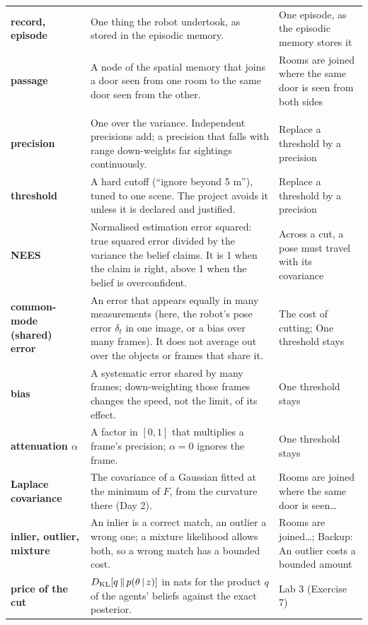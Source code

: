 \documentclass[11pt]{article}
\begin{document}
\begin{longtable}{@{}>{\raggedright\bfseries}p{2.8cm} p{8.9cm} >{\raggedright\arraybackslash}p{4.2cm}@{}}
record, episode & One thing the robot undertook, as stored in the episodic memory. & One episode, as the episodic memory stores it\\
passage & A node of the spatial memory that joins a door seen from one room to the same door seen from the other. & Rooms are joined where the same door is seen from both sides\\
\midrule
\multicolumn{3}{@{}l}{\emph{Inference terms}}\\
precision & One over the variance. Independent precisions add; a precision that falls with range down-weights far sightings continuously. & Replace a threshold by a precision\\
threshold & A hard cutoff (``ignore beyond 5 m''), tuned to one scene. The project avoids it unless it is declared and justified. & Replace a threshold by a precision\\
NEES & Normalised estimation error squared: true squared error divided by the variance the belief claims. It is 1 when the claim is right, above 1 when the belief is overconfident. & Across a cut, a pose must travel with its covariance\\
common-mode (shared) error & An error that appears equally in many measurements (here, the robot's pose error $\delta_t$ in one image, or a bias over many frames). It does not average out over the objects or frames that share it. & The cost of cutting; One threshold stays\\
bias & A systematic error shared by many frames; down-weighting those frames changes the speed, not the limit, of its effect. & One threshold stays\\
attenuation $\alpha$ & A factor in $[0,1]$ that multiplies a frame's precision; $\alpha=0$ ignores the frame. & One threshold stays\\
Laplace covariance & The covariance of a Gaussian fitted at the minimum of $F$, from the curvature there (Day 2). & Rooms are joined where the same door is seen\ldots\\
inlier, outlier, mixture & An inlier is a correct match, an outlier a wrong one; a mixture likelihood allows both, so a wrong match has a bounded cost. & Rooms are joined\ldots; Backup: An outlier costs a bounded amount\\
price of the cut & $D_{\mathrm{KL}}\!\left[q\,\middle\|\,p(\theta\,|\, z)\right]$ in nats for the product $q$ of the agents' beliefs against the exact posterior. & Lab 3 (Exercise 7)\\
\bottomrule
\end{longtable}
\end{document}
